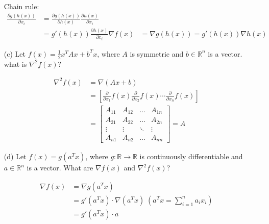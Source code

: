 \documentclass[11pt]{article}
\newcommand{\R}{\mathbb{R}}
\begin{document}
\begin{enumerate}
\color{blue}
Chain rule: 
\begin{equation*}
	\begin{aligned}
		\frac{\partial g(h(x))}{\partial x_i} &= \frac{\partial g(h(x))}{\partial h(x)} \frac{\partial h(x)}{\partial x_i} \\
&= g'(h(x)) \frac{\partial h(x)}{\partial x_i} 
\nabla f(x) &= \nabla g(h(x)) = g'(h(x)) \nabla h(x)
	\end{aligned}
\end{equation*}

\color{black}

\item[(c)]
Let $f(x) = \frac{1}{2}x^{T}Ax + b^{T}x$, where $A$ is symmetric and $b \in \R^{n}$ is a vector. what is $\nabla ^{2} f(x)?$

\color{blue}
\begin{equation*}
\begin{aligned}
	\nabla ^2 f(x) &= \nabla(Ax+b)\\
	&= [\frac{\partial}{\partial x_1}f(x) \frac{\partial}{\partial x_2}f(x) \cdots \frac{\partial}{\partial x_n}f(x)] \\
	&= \begin{bmatrix}
A_{11} & A_{12} & \dots & A_{1n} \\
A_{21} & A_{22} & \dots & A_{2n} \\
\vdots & \vdots & \ddots & \vdots \\
A_{n1} & A_{n2} & \dots & A_{nn}
\end{bmatrix} = A
\end{aligned}	
\end{equation*}

\color{black}

\item[(d)]
Let $f(x) = g(a^{T}x)$, where $g:\R \rightarrow \R$ is continuously differentiable and $a \in \R^{n}$ is a vector. What are $\nabla f(x)$ and $\nabla ^{2} f(x)$?

\color{blue}
\begin{equation*}
	\begin{aligned}
		\nabla f(x) &= \nabla g(a^T x) \\
		&= g'(a^T x) \cdot \nabla (a^T x) \; (a^T x = \sum_{i=1}^n a_i x_i)    \\
		&= g'(a^T x) \cdot a
	\end{aligned}
\end{equation*}


\end{enumerate}
\end{document}
